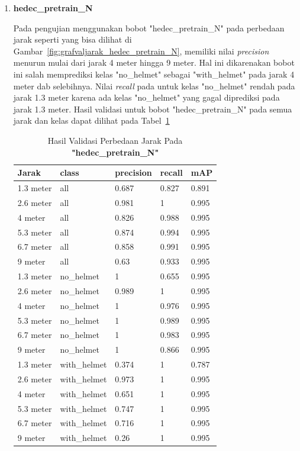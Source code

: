 \begin{enumerate}
  \item \textbf{hedec\_pretrain\_N}
  
  \par Pada pengujian menggunakan bobot "hedec\_pretrain\_N" pada perbedaan jarak seperti yang bisa dilihat di Gambar~\ref{fig:grafvaljarak_hedec_pretrain_N}, memiliki nilai
  \emph{precision} menurun mulai dari jarak 4 meter hingga 9 meter. Hal ini dikarenakan bobot ini salah memprediksi kelas "no\_helmet" sebagai "with\_helmet" pada jarak 4 meter
  dab selebihnya. Nilai \emph{recall} pada untuk kelas "no\_helmet" rendah pada jarak 1.3 meter karena ada kelas "no\_helmet" yang
  gagal diprediksi pada jarak 1.3 meter. Hasil validasi untuk bobot "hedec\_pretrain\_N" pada semua jarak dan kelas dapat dilihat pada Tabel~\ref{tb:hasiljarak_hedec_pretrain_N}

  \begin{table}[ht]
    \centering
    \caption{Hasil Validasi Perbedaan Jarak Pada \textbf{"hedec\_pretrain\_N"}}
    \label{tb:hasiljarak_hedec_pretrain_N}
    \begin{tabular}{|l|l|l|l|l|} 
      \hline
      Jarak     & class        & precision & recall & mAP    \\ 
      \hline
      1.3 meter & all          & 0.687     & 0.827  & 0.891  \\
      2.6 meter & all          & 0.981     & 1      & 0.995  \\
      4 meter   & all          & 0.826     & 0.988  & 0.995  \\
      5.3 meter & all          & 0.874     & 0.994  & 0.995  \\
      6.7 meter & all          & 0.858     & 0.991  & 0.995  \\
      9 meter   & all          & 0.63      & 0.933  & 0.995  \\
      1.3 meter & no\_helmet   & 1         & 0.655  & 0.995  \\
      2.6 meter & no\_helmet   & 0.989     & 1      & 0.995  \\
      4 meter   & no\_helmet   & 1         & 0.976  & 0.995  \\
      5.3 meter & no\_helmet   & 1         & 0.989  & 0.995  \\
      6.7 meter & no\_helmet   & 1         & 0.983  & 0.995  \\
      9 meter   & no\_helmet   & 1         & 0.866  & 0.995  \\
      1.3 meter & with\_helmet & 0.374     & 1      & 0.787  \\
      2.6 meter & with\_helmet & 0.973     & 1      & 0.995  \\
      4 meter   & with\_helmet & 0.651     & 1      & 0.995  \\
      5.3 meter & with\_helmet & 0.747     & 1      & 0.995  \\
      6.7 meter & with\_helmet & 0.716     & 1      & 0.995  \\
      9 meter   & with\_helmet & 0.26      & 1      & 0.995  \\
      \hline
    \end{tabular}
  \end{table}


\end{enumerate}
